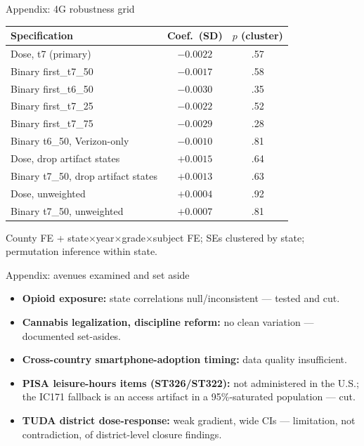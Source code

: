 \documentclass[11pt,aspectratio=169]{beamer}
\begin{document}
\begin{frame}{Appendix: 4G robustness grid}
\centering\small
\begin{tabular}{lcc}
\toprule
Specification & Coef.\ (SD) & $p$ (cluster) \\
\midrule
Dose, t7 (primary) & $-0.0022$ & .57 \\
Binary first\_t7\_50 & $-0.0017$ & .58 \\
Binary first\_t6\_50 & $-0.0030$ & .35 \\
Binary first\_t7\_25 & $-0.0022$ & .52 \\
Binary first\_t7\_75 & $-0.0029$ & .28 \\
Binary t6\_50, Verizon-only & $-0.0010$ & .81 \\
Dose, drop artifact states & $+0.0015$ & .64 \\
Binary t7\_50, drop artifact states & $+0.0013$ & .63 \\
Dose, unweighted & $+0.0004$ & .92 \\
Binary t7\_50, unweighted & $+0.0007$ & .81 \\
\bottomrule
\end{tabular}
\vspace{4pt}

{\small County FE + state$\times$year$\times$grade$\times$subject FE; SEs clustered by state; permutation inference within state.}
\end{frame}

\begin{frame}{Appendix: avenues examined and set aside}
\begin{itemize}
\item \textbf{Opioid exposure:} state correlations null/inconsistent --- tested and cut.
\item \textbf{Cannabis legalization, discipline reform:} no clean variation --- documented set-asides.
\item \textbf{Cross-country smartphone-adoption timing:} data quality insufficient.
\item \textbf{PISA leisure-hours items (ST326/ST322):} not administered in the U.S.; the IC171 fallback is an access artifact in a 95\%-saturated population --- cut.
\item \textbf{TUDA district dose-response:} weak gradient, wide CIs --- limitation, not contradiction, of district-level closure findings.
\end{itemize}
\end{frame}
\end{document}
